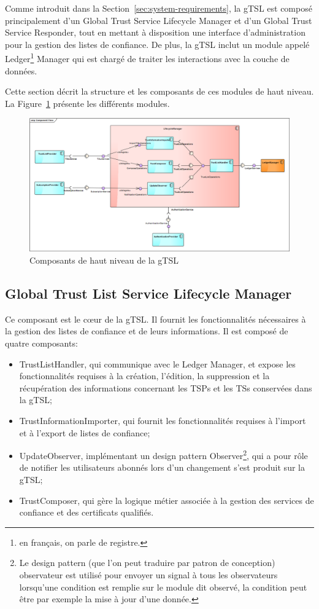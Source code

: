 \documentclass{tnreport}
\begin{document}
Comme introduit dans la Section~\ref{sec:system-requirements}, la gTSL est composé principalement d'un
Global Trust Service Lifecycle Manager et d'un Global Trust Service Responder, tout en mettant à disposition une interface d'administration pour la gestion des listes de confiance.
De plus, la gTSL inclut un module appelé Ledger\footnote{en français, on parle de registre.} Manager qui est chargé de traiter les interactions avec la couche de données.

Cette section décrit la structure et les composants de ces modules de haut niveau. La Figure~\ref{fig:highlevel-components} présente les différents modules.

\begin{figure}[h]
	\centering
	\includegraphics[scale=0.38]{figures/highlevel-components}
	\caption{Composants de haut niveau de la gTSL \cite{design-document}}
	\label{fig:highlevel-components}
\end{figure}

\subsection{Global Trust List Service Lifecycle Manager}

Ce composant est le cœur de la gTSL. Il fournit les fonctionnalités nécessaires à la gestion des listes de confiance et de leurs informations. Il est composé de quatre composants:
\begin{itemize}
	\item TrustListHandler, qui communique avec le Ledger Manager, et expose les fonctionnalités requises à la création, l'édition, la suppression et la récupération des informations concernant les TSPs et les TSs conservées dans la gTSL;
	\item TrustInformationImporter, qui fournit les fonctionnalités requises à l'import et à l'export de listes de confiance;
	\item UpdateObserver, implémentant un design pattern Observer\footnote{Le design pattern (que l'on peut traduire par patron de conception) observateur est utilisé pour envoyer un signal à tous les observateurs lorsqu'une condition est remplie sur le module dit observé, la condition peut être par exemple la mise à jour d'une donnée.}, qui a pour rôle de notifier les utilisateurs abonnés lors d'un changement s'est produit sur la gTSL;
	\item TrustComposer, qui gère la logique métier associée à la gestion des services de confiance et des certificats qualifiés.
\end{itemize}
\end{document}
